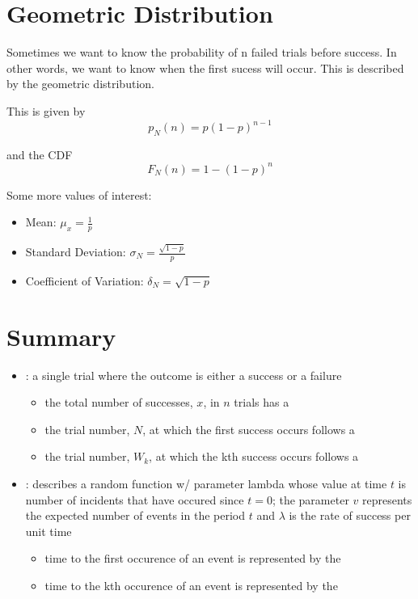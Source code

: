 \section*{Geometric Distribution}
Sometimes we want to know the probability of n failed trials before success. In other words, we want to know when the first sucess will occur. This is described by the geometric distribution.

This is given by 
\[
    p_N(n) = p (1-p)^{n-1}
\]

and the CDF 
\[
    F_N(n) = 1 - (1-p)^n
\]

Some more values of interest:
\begin{itemize}
    \item Mean: $\mu_x = \frac{1}{p}$
    \item Standard Deviation: $\sigma_N = \frac{\sqrt{1-p}}{p}$ 
    \item Coefficient of Variation: $\delta_N = \sqrt{1-p}$
\end{itemize}

\section*{Summary}
\begin{itemize}
    \item {}: a single trial where the outcome is either a success or a failure
    \begin{itemize} 
        \item the total number of successes, $x$, in $n$ trials has a  
        \item the trial number, $N$, at which the first success occurs follows a 
        \item the trial number, $W_k$, at which the kth success occurs follows a 
    \end{itemize}
    \item {}: describes a random function w/ parameter lambda whose value at time $t$ is number of incidents that have occured since $t = 0$; the parameter $v$ represents the expected number of events in the period $t$ and $\lambda$ is the rate of success per unit time
    \begin{itemize}
        \item time to the first occurence of an event is represented by the 
        \item time to the kth occurence of an event is represented by the 
    \end{itemize}
\end{itemize}
\vspace{1cm}
\begin{center}
\end{center}
